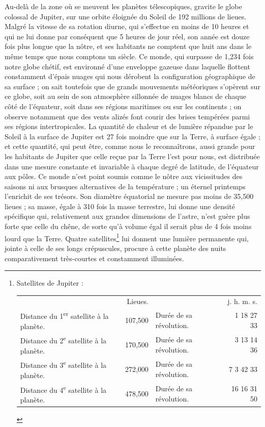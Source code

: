 \documentclass[a4paper, 11pt, oneside]{article}
\begin{document}
Au-delà de la zone où se meuvent les planètes télescopiques, gravite le globe colossal de Jupiter, sur une orbite éloignée du Soleil de 192 millions de lieues. Malgré la vitesse de sa rotation diurne, qui s'effectue en moins de 10 heures et qui ne lui donne par conséquent que 5 heures de jour réel, son année est douze fois plus longue que la nôtre, et ses habitants ne comptent que huit ans dans le même temps que nous comptons un siècle. Ce monde, qui surpasse de 1,234 fois notre globe chétif, est environné d'une enveloppe gazeuse dans laquelle flottent constamment d'épais nuages qui nous dérobent la configuration géographique de sa surface ; on sait toutefois que de grands mouvements météoriques s'opèrent sur ce globe, soit au sein de son atmosphère sillonnée de nuages blancs de chaque côté de l'équateur, soit dans ses régions maritimes ou sur les continents ; on observe notamment que des vents alizés font courir des brises tempérées parmi ses régions intertropicales. La quantité de chaleur et de lumière répandue par le Soleil à la surface de Jupiter est 27 fois moindre que sur la Terre, à surface égale ; et cette quantité, qui peut être, comme nous le reconnaîtrons, aussi grande pour les habitants de Jupiter que celle reçue par la Terre l'est pour nous, est distribuée dans une mesure constante et invariable à chaque degré de latitude, de l'équateur aux pôles. Ce monde n'est point soumis comme le nôtre aux vicissitudes des saisons ni aux brusques alternatives de la température ; un éternel printemps l'enrichit de ses trésors. Son diamètre équatorial ne mesure pas moins de 35,500 lieues ; sa masse, égale à 310 fois la masse terrestre, lui donne une densité spécifique qui, relativement aux grandes dimensions de l'astre, n'est guère plus forte que celle du chêne, de sorte qu'à volume égal il serait plus de 4 fois moins lourd que la Terre. Quatre satellites\footnote{Satellites de Jupiter :\\
\begin{table}[H]
    \centering
    \footnotesize
    \Fontauri
    \begin{tabular}{l r l r}
        ~ & Lieues. & ~ & j. h. m. s.   \\
        Distance du 1\textsuperscript{er} satellite à la planète. & 107,500 & Durée de sa révolution. & 1 18 27 33   \\
        Distance du 2\textsuperscript{e} satellite à la planète. & 170,500 & Durée de sa révolution. & 3 13 14 36   \\
        Distance du 3\textsuperscript{e} satellite à la planète. & 272,000 & Durée de sa révolution. & 7 3 42 33   \\
        Distance du 4\textsuperscript{e} satellite à la planète. & 478,500 & Durée de sa révolution. & 16 16 31 50 \\
    \end{tabular}
\end{table}} lui donnent une lumière permanente qui, jointe à celle de ses longs crépuscules, procure à cette planète des nuits comparativement très-courtes et constamment illuminées.
\end{document}
